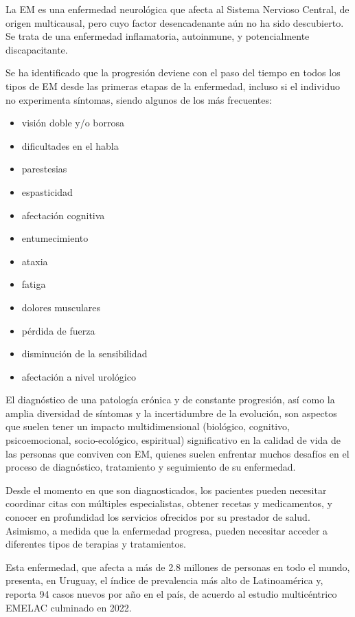 La EM es una enfermedad neurológica que afecta al Sistema Nervioso Central, de origen multicausal, pero cuyo factor desencadenante aún no ha sido descubierto. Se trata de una enfermedad inflamatoria, autoinmune, y potencialmente discapacitante.

Se ha identificado que la progresión deviene con el paso del tiempo en todos los tipos de EM desde las primeras etapas de la enfermedad, incluso si el individuo no experimenta síntomas, siendo algunos de los más frecuentes:

\begin{itemize}
\tightlist
\item
    visión doble y/o borrosa 
\item
    dificultades en el habla
\item
    parestesias 
\item
    espasticidad 
\item
    afectación cognitiva     
\item   
    entumecimiento 
\item   
    ataxia 
\item   
    fatiga
\item   
    dolores musculares
\item   
    pérdida de fuerza
\item   
    disminución de la sensibilidad
\item   
    afectación a nivel urológico
\end{itemize}

El diagnóstico de una patología crónica y de constante progresión, así como la amplia diversidad de síntomas y la incertidumbre de la evolución, son aspectos que suelen tener un impacto multidimensional (biológico, cognitivo, psicoemocional, socio-ecológico, espiritual) significativo en la calidad de vida de las personas que conviven con EM, quienes suelen enfrentar muchos desafíos en el proceso de diagnóstico, tratamiento y seguimiento de su enfermedad. 

Desde el momento en que son diagnosticados, los pacientes pueden necesitar coordinar citas con múltiples especialistas, obtener recetas y medicamentos, y conocer en profundidad los servicios ofrecidos por su prestador de salud. Asimismo, a medida que la enfermedad progresa, pueden necesitar acceder a diferentes tipos de terapias y tratamientos. 

Esta enfermedad, que afecta a más de 2.8 millones de personas en todo el mundo, presenta, en Uruguay, el índice de prevalencia más alto de Latinoamérica  y, reporta 94 casos nuevos por año en el país, de acuerdo al estudio multicéntrico EMELAC culminado en 2022.

